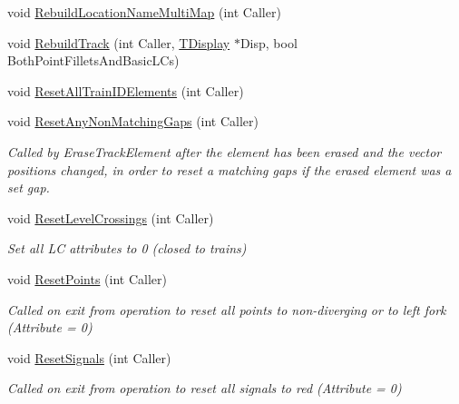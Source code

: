 \begin{DoxyCompactItemize}
void \mbox{\hyperlink{class_t_track_a4a948544c9ac877232ec721db8bfc914}{Rebuild\+Location\+Name\+Multi\+Map}} (int Caller)
\item 
void \mbox{\hyperlink{class_t_track_afbd25aa0deb973061c8500a4509136e0}{Rebuild\+Track}} (int Caller, \mbox{\hyperlink{class_t_display}{T\+Display}} $\ast$Disp, bool Both\+Point\+Fillets\+And\+Basic\+L\+Cs)
\item 
void \mbox{\hyperlink{class_t_track_a9430d0a48a27e59f41015c5812aa5de2}{Reset\+All\+Train\+I\+D\+Elements}} (int Caller)
\item 
\mbox{\label{class_t_track_ac416bb4b69d75d4c5c0303a2cadd52ca}} 
void \mbox{\hyperlink{class_t_track_ac416bb4b69d75d4c5c0303a2cadd52ca}{Reset\+Any\+Non\+Matching\+Gaps}} (int Caller)
\begin{DoxyCompactList}\small\item\em Called by Erase\+Track\+Element after the element has been erased and the vector positions changed, in order to reset a matching gaps if the erased element was a set gap. \end{DoxyCompactList}\item 
\mbox{\label{class_t_track_a1a5d8cf5f3a46667a745bfcf4c77ba9d}} 
void \mbox{\hyperlink{class_t_track_a1a5d8cf5f3a46667a745bfcf4c77ba9d}{Reset\+Level\+Crossings}} (int Caller)
\begin{DoxyCompactList}\small\item\em Set all LC attributes to 0 (closed to trains) \end{DoxyCompactList}\item 
\mbox{\label{class_t_track_a84f04a79d9caca625e0b279c5690ddb7}} 
void \mbox{\hyperlink{class_t_track_a84f04a79d9caca625e0b279c5690ddb7}{Reset\+Points}} (int Caller)
\begin{DoxyCompactList}\small\item\em Called on exit from operation to reset all points to non-\/diverging or to left fork (Attribute = 0) \end{DoxyCompactList}\item 
\mbox{\label{class_t_track_acbb91e9cbc84e3dee44f1ca4de1907e8}} 
void \mbox{\hyperlink{class_t_track_acbb91e9cbc84e3dee44f1ca4de1907e8}{Reset\+Signals}} (int Caller)
\begin{DoxyCompactList}\small\item\em Called on exit from operation to reset all signals to red (Attribute = 0) \end{DoxyCompactList}\item 

\end{DoxyCompactItemize}
